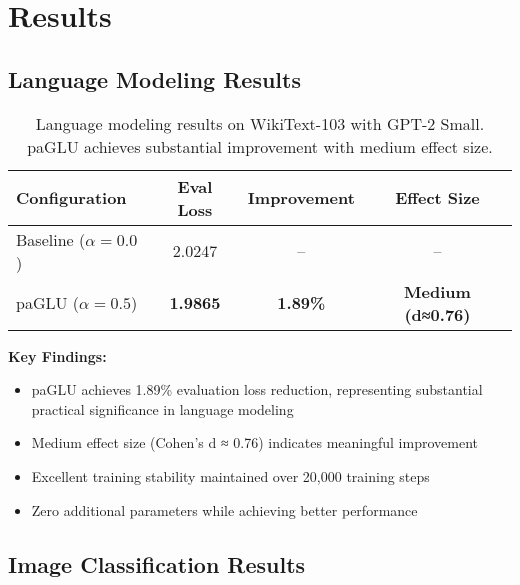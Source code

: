 
\section{Results}

\subsection{Language Modeling Results}

\begin{table}[h]
\centering
\caption{Language modeling results on WikiText-103 with GPT-2 Small. paGLU achieves substantial improvement with medium effect size.}
\label{tab:nlp_results}
\begin{tabular}{lccc}
\toprule
Configuration & Eval Loss & Improvement & Effect Size \\
\midrule
Baseline ($\alpha=0.0$) & 2.0247 & -- & -- \\
paGLU ($\alpha=0.5$) & \textbf{1.9865} & \textbf{1.89\%} & \textbf{Medium (d≈0.76)} \\
\bottomrule
\end{tabular}
\end{table}

\textbf{Key Findings:}
\begin{itemize}
    \item paGLU achieves 1.89\% evaluation loss reduction, representing substantial practical significance in language modeling
    \item Medium effect size (Cohen's d ≈ 0.76) indicates meaningful improvement
    \item Excellent training stability maintained over 20,000 training steps
    \item Zero additional parameters while achieving better performance
\end{itemize}

\subsection{Image Classification Results}


